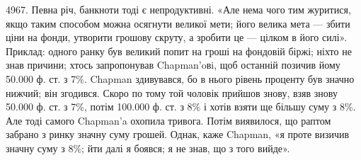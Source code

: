 4967. Певна річ, банкноти тоді є непродуктивні. «Але нема чого тим
журитися, якщо таким способом можна осягнути великої мети; його велика
мета — збити ціни на фонди, утворити грошову скруту, а зробити це — цілком
в його силі». Приклад: одного ранку був великий попит на гроші на фондовій
біржі; ніхто не знав причини; хтось запропонував Chapman’oвi, щоб останній
позичив йому 50.000 ф. ст. з 7\%. Chapman здивувався, бо в нього рівень
проценту був значно нижчий; він згодився. Скоро по тому той чоловік прийшов
знову, взяв знову 50.000 ф. ст. з 7\%, потім 100.000 ф. ст. з 8\% і хотів
взяти ще більшу суму з 8\%. Але тоді самого Chapman’a охопила тривога.
Потім виявилося, що раптом забрано з ринку значну суму грошей. Однак, каже
Chapman, «я проте визичив значну суму з 8\%; йти далі я боявся; я не знав,
що з того вийде».
